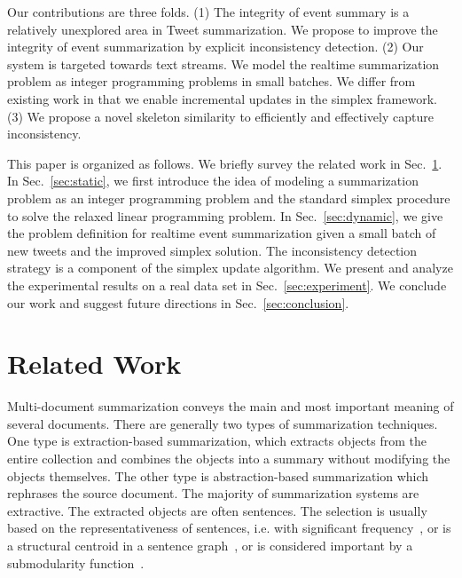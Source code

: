 \documentclass[envcountsame]{llncs}
\begin{document}
Our contributions are three folds. (1) The integrity of event summary is a relatively unexplored area in Tweet summarization. We propose to improve the integrity of event summarization by explicit inconsistency detection. (2) Our system is targeted towards text streams. We model the realtime summarization problem as integer programming problems in small batches. We differ from existing work in that we enable incremental updates in the simplex framework. (3) We propose a novel skeleton similarity to efficiently and effectively capture inconsistency.

This paper is organized as follows. We briefly survey the related work in Sec.~\ref{sec:related}. In Sec.~\ref{sec:static}, we first introduce the idea of modeling a summarization problem as an integer programming problem and the standard simplex procedure to solve the relaxed linear programming problem. In Sec.~\ref{sec:dynamic}, we give the problem definition for realtime event summarization given a small batch of new tweets and the improved simplex solution. The inconsistency detection strategy is a component of the simplex update algorithm. We present and analyze the experimental results on a real data set in Sec.~\ref{sec:experiment}. We conclude our work and suggest future directions in Sec.~\ref{sec:conclusion}.

\section{Related Work}\label{sec:related}

Multi-document summarization conveys the main and most important meaning of several documents. There are generally two types of summarization techniques. One type is extraction-based summarization, which extracts objects from the entire collection and combines the objects into a summary without modifying the objects themselves. The other type is abstraction-based summarization which rephrases the source document. The majority of summarization systems are extractive. The extracted objects are often sentences. The selection is usually based on the representativeness of sentences, i.e. with significant frequency~\cite{Yih2007Multi-document}, or is a structural centroid in a sentence graph~\cite{Lin2012Generating}, or is considered important by a submodularity function~\cite{MSSF}.
\end{document}
